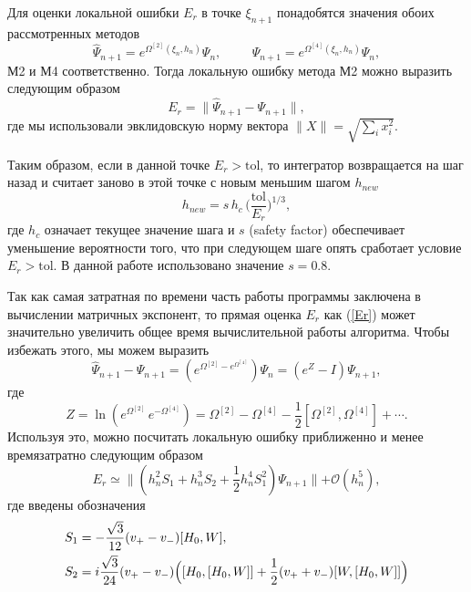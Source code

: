 \documentclass[12pt]{article}
\numberwithin{equation}{section}
\begin{document}
Для оценки локальной ошибки $E_r$ в точке $\xi_{n+1}$  понадобятся значения обоих рассмотренных методов
\begin{equation}
\hat\Psi_{n+1}=e^{\Omega^{[2]}(\xi_n,h_n)}\Psi_n,
\hspace{1cm}
\Psi_{n+1}=e^{\Omega^{[4]}(\xi_n,h_n)}\Psi_n,
\end{equation}
М2 и М4 соответственно. Тогда локальную ошибку метода М2 можно выразить следующим образом
\begin{equation}
\label{Er}
E_r=\parallel \hat\Psi_{n+1} - \Psi_{n+1} \parallel,
\end{equation}
где мы использовали эвклидовскую норму вектора $\parallel\! X\!\parallel=\sqrt{\sum\limits_i x^2_i}$.

Таким образом, если в данной точке $E_r>\text{tol}$, то интегратор возвращается на шаг назад и считает заново в этой точке с новым меньшим шагом $h_{new}$
\begin{equation}
h_{new}=s\,h_c\, \biggl(\frac{\text{tol}}{E_r}\biggr)^{1/3},
\end{equation}
где $h_c$ означает текущее значение шага и $s$ (safety factor) обеспечивает уменьшение вероятности того, что при следующем шаге опять сработает условие $E_r>\text{tol}$. В данной работе использовано значение $s=0.8$.

Так как самая затратная по времени часть работы программы заключена в вычислении матричных экспонент, то прямая оценка $E_r$ как (\ref{Er}) может значительно увеличить общее время вычислительной работы алгоритма. Чтобы избежать этого, мы можем выразить
\begin{equation}
\hat\Psi_{n+1}-\Psi_{n+1}=(e^{\Omega^{[2]}-e^{\Omega^{[4]}}})\Psi_n=(e^Z-I)\Psi_{n+1},
\end{equation}
где 
\begin{equation}
\label{Z}
Z=\ln(e^{\Omega^{[2]}}\,e^{-\Omega^{[4]}})=\Omega^{[2]} - \Omega^{[4]} - \frac{1}{2}[\Omega^{[2]},\Omega^{[4]}]+\cdots .
\end{equation}
Используя это, можно посчитать локальную ошибку приближенно и менее времязатратно следующим образом
\begin{equation}
E_r\simeq\parallel(h^2_n S_1+h^3_n S_2 + \frac{1}{2}h^4_n S^2_1)\Psi_{n+1}\parallel + \mathcal{O}(h^5_n),
\end{equation}
где введены обозначения
\begin{align}
S_1&=-\frac{\sqrt{3}}{12}(v_+-v_-)[H_0,W],\\
S_2&=i\frac{\sqrt{3}}{24}(v_+-v_-)\Bigl([H_0,[H_0,W]]+\frac{1}{2}(v_++v_-)[W,[H_0,W]]\Bigr)
\end{align}
\end{document}
